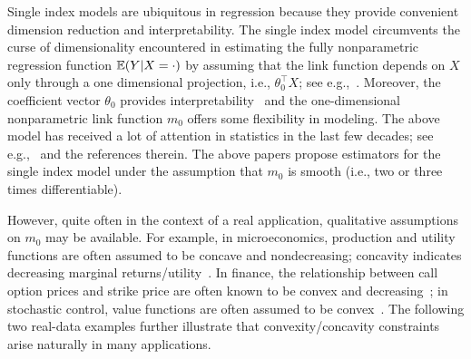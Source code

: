 Single index models are ubiquitous in regression because they provide convenient dimension reduction and interpretability. The single index model circumvents the curse of dimensionality encountered in estimating the fully nonparametric regression function $\mathbb{E}(Y|X = \cdot)$ by assuming that the link function depends on $X$ only through a one dimensional projection, i.e., $\theta_0^\top X$; see e.g.,~\cite{Powelletal89}. Moreover, the coefficient vector $\theta_0$ provides interpretability~\citep{liracine07} and the one-dimensional nonparametric link function $m_0$ offers some flexibility in modeling. The above model has received a lot of attention in statistics in the last few decades; see e.g.,~\cite{Powelletal89,LiDuan89,ICHI93,HardleEtAl93,Hristacheetal01,DelecroixEtal06,cuietal11,Patra16} and the references therein. The above papers propose estimators for the single index model under the assumption that $m_0$ is smooth (i.e., two or three times differentiable). 

 However, quite often in the context of a real application, qualitative assumptions on $m_0$ may be available. 
 For example, in microeconomics, production and utility functions are often assumed to be concave and nondecreasing; concavity indicates decreasing marginal returns/utility~\citep{Varian84,Matzkin91,liracine07}. In finance, the relationship between call option prices and strike price are often known to be convex and decreasing~\citep{AD03}; in stochastic control, value functions are often assumed to be convex~\citep{K11}.  The following two real-data examples further illustrate that convexity/concavity constraints arise naturally in many applications.

